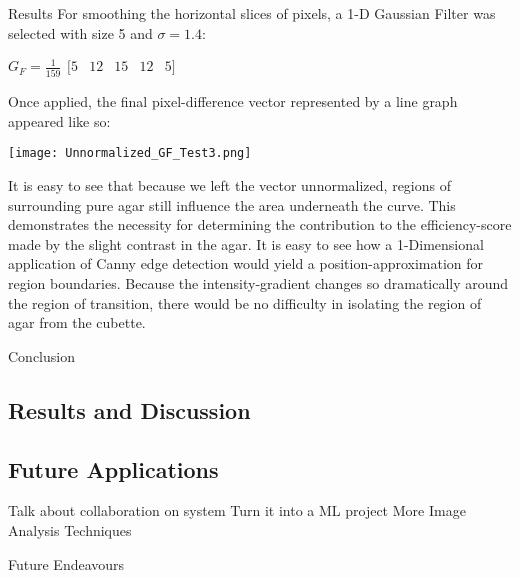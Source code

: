 \documentclass[a4paper,12pt]{article}
\begin{document}
\begin{section}{Results}
For smoothing the horizontal slices of pixels, a 1-D Gaussian Filter was selected with size 5 and $\sigma = 1.4$:

\begin{center}
$G_F = \frac{1}{159}
\begin{matrix}
[ 5 & 12 & 15 & 12 & 5 ]
\end{matrix}$
\end{center}
	
Once applied, the final pixel-difference vector represented by a line graph appeared like so:

\begin{center}
\texttt{[image: Unnormalized\_GF\_Test3.png]}
\end{center}

It is easy to see that because we left the vector unnormalized, regions of surrounding pure agar still influence the area underneath the curve. This demonstrates the necessity for determining the contribution to the efficiency-score made by the slight contrast in the agar. It is easy to see how a 1-Dimensional application of Canny edge detection would yield a position-approximation for region boundaries. Because the intensity-gradient changes so dramatically around the region of transition, there would be no difficulty in isolating the region of agar from the cubette.

\end{section}

\newpage
\begin{section}{Conclusion}
\subsection{Results and Discussion}

\subsection{Future Applications}

Talk about collaboration on system
	Turn it into a ML project
	More Image Analysis Techniques

Future Endeavours
\end{section}
\end{document}
